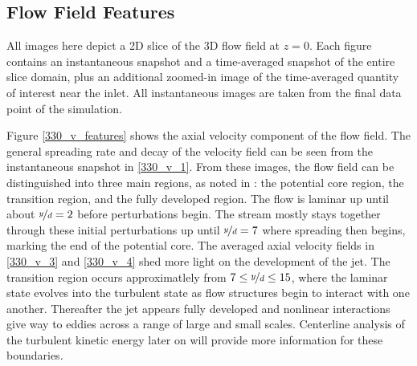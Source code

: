 \subsection{Flow Field Features}
All images here depict a 2D slice of the 3D flow field at $z=0$. Each figure contains an instantaneous snapshot and a time-averaged snapshot of the entire slice domain, plus an additional zoomed-in image of the time-averaged quantity of interest near the inlet. All instantaneous images are taken from the final data point of the simulation.

Figure \ref{330_v_features} shows the axial velocity component of the flow field. The general spreading rate and decay of the velocity field can be seen from the instantaneous snapshot in \ref{330_v_1}. From these images, the flow field can be distinguished into three main regions, as noted in \cite{iso_comp_1_ref_1}: the potential core region, the transition region, and the fully developed region. The flow is laminar up until about $\nicefrac{y}{d}=2$ before perturbations begin. The stream mostly stays together through these initial perturbations up until $\nicefrac{y}{d}=7$ where spreading then begins, marking the end of the potential core. The averaged axial velocity fields in \ref{330_v_3} and \ref{330_v_4} shed more light on the development of the jet. The transition region occurs approximatlely from $7 \leq \nicefrac{y}{d} \leq 15$, where the laminar state evolves into the turbulent state as flow structures begin to interact with one another. Thereafter the jet appears fully developed and nonlinear interactions give way to eddies across a range of large and small scales. Centerline analysis of the turbulent kinetic energy later on will provide more information for these boundaries.  


